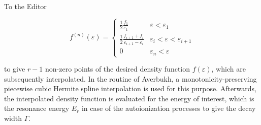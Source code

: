 \documentclass[DIN,pagenumber=false,parskip=half,fromalign=left,fromphone=true,fromemail=true,fromurl=false,fromlogo=false,fromrule=false]{scrlttr2}
\begin{document}
\begin{letter}{To the Editor}
\begin{enumerate}
       \begin{equation}                                                  
         f^{(n)} (\varepsilon) =                                              
         \begin{cases}                                                   
           \frac 12 \frac{f_1}{\varepsilon_1}    & \varepsilon < \varepsilon_1\\        
           \frac 12 \frac{f_{i+1} + f_i}{\varepsilon_{i+1} - \varepsilon_i}        
                                          & \varepsilon_i < \varepsilon < \varepsilon_{i+1}\\
           0                              & \varepsilon_n < \varepsilon
         \end{cases}                                                     
       \end{equation}
       
       to give  $r-1$ non-zero points of the desired
       density function $f(\varepsilon)$, which are
       subsequently interpolated.
       In the routine of Averbukh, a
       monotonicity-preserving piecewise cubic Hermite spline interpolation
       is used for this purpose. Afterwards, the interpolated density function is evaluated
       for the energy of interest, which is the resonance energy $E_r$ in case of the
       autoionization processes to give the decay width $\Gamma$.
       {\color{blue}{Finally, convergence of the decay widths with increasing orders of 
       moments is investigated.}}
       

\end{enumerate}
\end{letter}
\end{document}
